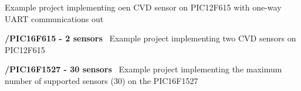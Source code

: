 \begin{DoxyItemize}
\begin{DoxyItemize}
\begin{DoxyItemize}
 Example project implementing oen C\+V\+D sensor on P\+I\+C12\+F615 with one-\/way U\+A\+R\+T communications out 
\item {\bfseries /\+P\+I\+C16\+F615 -\/ 2 sensors}~\newline
 Example project implementing two C\+V\+D sensors on P\+I\+C12\+F615 
\item {\bfseries /\+P\+I\+C16\+F1527 -\/ 30 sensors}~\newline
 Example project implementing the maximum number of supported sensors (30) on the P\+I\+C16\+F1527 
\end{DoxyItemize}
\end{DoxyItemize}
\end{DoxyItemize}